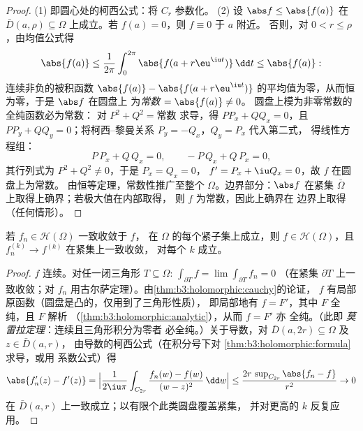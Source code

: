 \begin{proof}
(1) 即圆心处的柯西公式：将 $C_r$ 参数化。
(2) 设 $\abs f \leq \abs{f(a)}$ 在 $\bar D(a, \rho)
\subseteq \Omega$ 上成立。若 $f(a) = 0$，则 $f \equiv 0$ 于 $a$ 附近。
否则，对 $0 < r \leq \rho$，由均值公式得
\[
\abs{f(a)} \leq \frac1{2\pi}\int_0^{2\pi}\abs{f(a +
r\eu^{\iu t})}\,\dd t \leq \abs{f(a)} :
\]
连续非负的被积函数 $\abs{f(a)} - \abs{f(a +
r\eu^{\iu t})}$ 的平均值为零，从而恒为零，于是 $\abs f$ 在圆盘上
为\emph{常数} $= \abs{f(a)} \ne 0$。
圆盘上模为非零常数的全纯函数必为常数：
对 $P^2 + Q^2 = \text{常数}$ 求导，得 $PP_x + QQ_x
= 0$，且 $PP_y + QQ_y = 0$；将柯西–黎曼关系
$P_y = -Q_x$，$Q_y = P_x$ 代入第二式，
得线性方程组：
\[
P\,P_x + Q\,Q_x = 0, \qquad -P\,Q_x + Q\,P_x = 0,
\]
其行列式为 $P^2 + Q^2 \neq 0$，于是 $P_x = Q_x = 0$，
$f' = P_x + \iu Q_x = 0$，故 $f$ 在圆盘上为常数。
由恒等定理，常数性推广至整个 $\Omega$。边界部分：$\abs f$
在紧集 $\bar\Omega$ 上取得上确界；若极大值在内部取得，
则 $f$ 为常数，因此上确界在
边界上取得（任何情形）。
\end{proof}

\begin{theorem}[魏尔斯特拉斯收敛定理]
\label{thm:b3:holomorphic:weierstrassconv}
若 $f_n \in \mathcal H(\Omega)$ 一致收敛于 $f$，
在 $\Omega$ 的每个紧子集上成立，则 $f \in \mathcal
H(\Omega)$，且 $f_n^{(k)} \to f^{(k)}$ 在紧集上一致收敛，
对每个 $k$ 成立。
\end{theorem}

\begin{proof}
$f$ 连续。对任一闭三角形 $T \subseteq
\Omega$: $\int_{\partial T}f = \lim\int_{\partial T}f_n = 0$
（在紧集 $\partial T$ 上一致收敛；对
$f_n$ 用古尔萨定理）。由\cref{thm:b3:holomorphic:cauchy}的论证，
$f$ 有局部原函数（圆盘是凸的，仅用到了三角形性质），
即局部地有 $f = F'$，其中 $F$
全纯，且 $F$ 解析
（\cref{thm:b3:holomorphic:analytic}），从而 $f = F'$ 亦
全纯。（此即
\emph{莫雷拉定理}：连续且三角形积分为零者
必全纯。）关于导数，对
$\bar D(a, 2r) \subseteq \Omega$ 及 $z \in \bar D(a, r)$，
由导数的柯西公式（在积分号下对
\cref{thm:b3:holomorphic:formula}求导，或用
系数公式）得
\[
\abs{f_n'(z) - f'(z)} =
\Bigl|\frac{1}{2\iu\pi}\int_{C_{2r}}\frac{f_n(w) - f(w)}{(w -
z)^2}\,\dd w\Bigr|
\leq \frac{2r\,\sup_{C_{2r}}\abs{f_n - f}}{r^2} \to 0
\]
在 $\bar D(a,r)$ 上一致成立；以有限个此类圆盘覆盖紧集，
并对更高的 $k$ 反复应用。
\end{proof}

